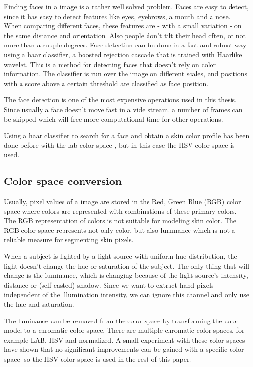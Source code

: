 Finding faces in a image is a rather well solved problem. Faces are easy to detect, since it has easy to detect features like eyes, eyebrows, a mouth and a nose. When comparing different faces, these features are - with a small variation - on the same distance and orientation. Also people don't tilt their head often, or not more than a couple degrees. Face detection can be done in a fast and robust way using a haar classifier, a boosted rejection cascade that is trained with Haar\-like wavelet\cite{Lienhart2002}. This is a method for detecting faces that doesn't rely on color information. The classifier is run over the image on different scales, and positions with a score above a certain threshold are classified as face position.

The face detection is one of the most expensive operations used in this thesis. Since usually a face doesn't move fast in a vide stream, a number of frames can be skipped which will free more computational time for other operations.

Using a haar classifier to search for a face and obtain a skin color profile has been done before with the lab color space \cite{Stenger2006}, but in this case the HSV color space is used.

\subsection*{Color space conversion}
Usually, pixel values of a image are stored in the Red, Green Blue (RGB) color space where colors are represented with combinations of these primary colors. The RGB representation of colors is not suitable for modeling skin color. The RGB color space represents not only color, but also luminance which is not a reliable measure for segmenting skin pixels\cite{Cai1999}.

When a subject is lighted by a light source with uniform hue distribution, the light doesn't change the hue or saturation of the subject. The only thing that will change is the luminance, which is changing because of the light source's intensity, distance or (self casted) shadow. Since we want to extract hand pixels independent of the illumination intensity, we can ignore this channel and only use the hue and saturation.

The luminance can be removed from the color space by transforming the color model to a chromatic color space. There are multiple chromatic color spaces, for example LAB, HSV and normalized. A small experiment with these color spaces have shown that no significant improvements can be gained with a specific color space, so the HSV color space is used in the rest of this paper.


